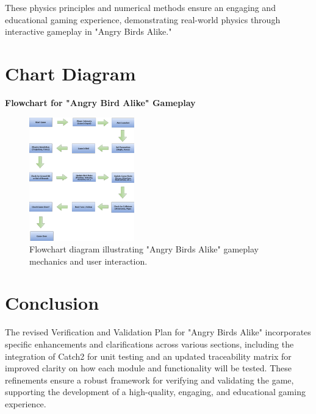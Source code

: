 \documentclass[12pt]{article}
\begin{document}
These physics principles and numerical methods ensure an engaging and educational gaming experience, demonstrating real-world physics through interactive gameplay in "Angry Birds Alike."

\section{Chart Diagram}
\textbf{Flowchart for "Angry Bird Alike" Gameplay}

\begin{figure}[!hb]
    \centering
    \includegraphics[width=0.5\linewidth]{Flowchartvnv.png}
    \caption{Flowchart diagram illustrating "Angry Birds Alike" gameplay mechanics and user interaction.}
    \label{fig:flowchart}
\end{figure}

\FloatBarrier
\section{Conclusion}
The revised Verification and Validation Plan for "Angry Birds Alike" incorporates specific enhancements and clarifications across various sections, including the integration of Catch2 for unit testing and an updated traceability matrix for improved clarity on how each module and functionality will be tested. These refinements ensure a robust framework for verifying and validating the game, supporting the development of a high-quality, engaging, and educational gaming experience.
\end{document}
